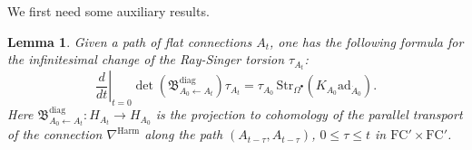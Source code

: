 \documentclass[11pt,a4paper]{amsart}
\theoremstyle{plain} %
\newtheorem{lem}[thm]{Lemma}
\theoremstyle{definition}
\theoremstyle{remark}
\newcommand{\mr}{\mathrm}
\newcommand{\bt}{\bullet}
\newcommand{\ra}{\rightarrow}
\newcommand{\ad}{\mathrm{ad}}
\newcommand{\FC}{\mathrm{FC}}
\newcommand{\la}{\leftarrow}
\newcommand{\BB}{\mathfrak{B}}
\begin{document}
We first need some auxiliary results.

\begin{lem}\label{lemma: dependence of torsion on A}
Given a path of flat connections $A_t$, one has the following formula for the infinitesimal change of the Ray-Singer torsion $\tau_{A_t}$:
    \begin{equation}\label{tau dependence on A}
        \left.\frac{d}{dt}\right|_{t=0}\det(\BB^\mr{diag}_{A_0\la A_t})\tau_{A_t}=\tau_{A_0}\,\mr{Str}_{\Omega^\bt}(K_{A_0}\ad_{\dot{A}_0}).
    \end{equation}
    Here $\BB^\mr{diag}_{A_0\la A_t}\colon H_{A_t}\ra H_{A_0}$ is the projection to cohomology of the parallel transport of the connection $\nabla^\mr{Harm}$ along the path $(A_{t-\tau},A_{t-\tau})$, $0\leq \tau\leq t$ in $\FC'\times\FC'$.
\end{lem}
\end{document}
